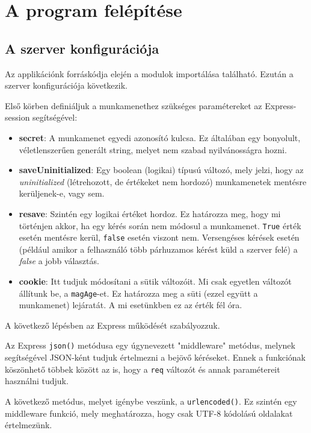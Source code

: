 \section{A program felépítése}


\subsection{A szerver konfigurációja}

Az applikációnk forráskódja elején a modulok importálása található. Ezután a szerver konfigurációja következik.

Első körben definiáljuk a munkamenethez szükséges paramétereket az Express-session segítségével:
\begin{itemize}
\item{\textbf{secret}: A munkamenet egyedi azonosító kulcsa. Ez általában egy bonyolult, véletlenszerűen generált string, melyet nem szabad nyilvánosságra hozni.}
\item{\textbf{saveUninitialized}: Egy boolean (logikai) típusú változó, mely jelzi, hogy az \textit{uninitialized} (létrehozott, de értékeket nem hordozó) munkamenetek mentésre kerüljenek-e, vagy sem.}
\item{\textbf{resave}: Szintén egy logikai értéket hordoz. Ez határozza meg, hogy mi történjen akkor, ha egy kérés során nem módosul a munkamenet. \texttt{True} érték esetén mentésre kerül, \texttt{false} esetén viszont nem. Versengéses kérések esetén (például amikor a felhasználó több párhuzamos kérést küld a szerver felé) a \textit{false} a jobb választás.}
\item{\textbf{cookie}: Itt tudjuk módosítani a sütik változóit. Mi csak egyetlen változót állítunk be, a \texttt{magAge}-et. Ez határozza meg a süti (ezzel együtt a munkamenet) lejáratát. A mi esetünkben ez az érték fél óra.}
\end{itemize}

\noindent
A következő lépésben az Express működését szabályozzuk.

Az Express \texttt{json()} metódusa egy úgynevezett "middleware" metódus, melynek segítségével JSON-ként tudjuk értelmezni a bejövő kéréseket. Ennek a funkciónak köszönhető többek között az is, hogy a \texttt{req} változót és annak paramétereit használni tudjuk.

A következő metódus, melyet igénybe veszünk, a \texttt{urlencoded()}. Ez szintén egy middleware funkció, mely meghatározza, hogy csak UTF-8 kódolású oldalakat értelmezünk.

